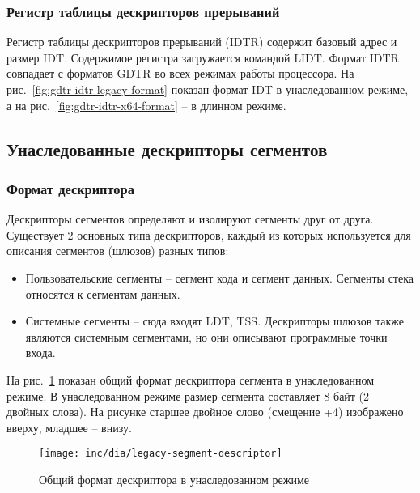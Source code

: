 \subsubsection*{Регистр таблицы дескрипторов прерываний}
Регистр таблицы дескрипторов прерываний (IDTR) содержит базовый адрес и размер IDT.
Содержимое регистра загружается командой LIDT. Формат IDTR совпадает с форматов GDTR во
всех режимах работы процессора. На рис.~\ref{fig:gdtr-idtr-legacy-format} показан формат
IDT в унаследованном режиме, а на рис.~\ref{fig:gdtr-idtr-x64-format} -- в длинном режиме.

\subsection{Унаследованные дескрипторы сегментов}
\subsubsection*{Формат дескриптора}
Дескрипторы сегментов определяют и изолируют сегменты друг от друга. Существует 2 основных типа
дескрипторов, каждый из которых используется для описания сегментов (шлюзов) разных типов:
\begin{itemize}
\item Пользовательские сегменты -- сегмент кода и сегмент данных. Сегменты стека относятся к сегментам данных.
\item Системные сегменты -- сюда входят LDT, TSS. Дескрипторы шлюзов также являются системным сегментами, но
	они описывают программные точки входа.
\end{itemize}

На рис.~\ref{fig:legacy-segment-descriptor-format} показан общий формат дескриптора сегмента в унаследованном режиме.
В унаследованном режиме размер сегмента составляет 8 байт (2 двойных слова). На рисунке старшее двойное слово (смещение +4)
изображено вверху, младшее -- внизу.

\begin{figure}[ht]
  \centering
  \texttt{[image: inc/dia/legacy-segment-descriptor]}
  \caption{Общий формат дескриптора в унаследованном режиме}
  \label{fig:legacy-segment-descriptor-format}
\end{figure}

